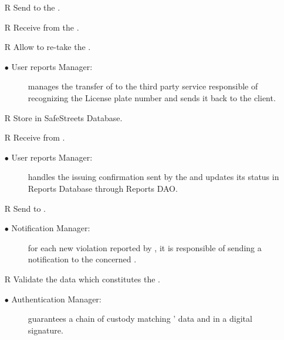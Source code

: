 \documentclass[../DD.tex]{subfiles}
\begin{document}
\begin{itemize}
	\item[R\subs{7}]Send  to the .
	\item[R\subs{8}]Receive  from the .
	\item[R\subs{26}]Allow  to re-take the .
	\begin{description}
	\item[$\bullet$ User reports Manager:] manages the transfer of  to the third party service responsible of recognizing the License plate number and sends it back to the client.
	\end{description}

	\item[R\subs{12}]Store  in SafeStreets Database.
	\item[R\subs{25}]Receive  from .	
	\begin{description}
	\item[$\bullet$ User reports Manager:] handles the  issuing confirmation sent by the  and updates its status in Reports Database through Reports DAO.
	\end{description}

	\item[R\subs{11}]Send  to .
	\begin{description}
	\item[$\bullet$ Notification Manager:] for each new violation reported by , it is responsible of sending a notification to the concerned . 
	\end{description}

	\item[R\subs{15}]Validate the data which constitutes the .
	\begin{description}
	\item[$\bullet$ Authentication Manager:] guarantees a chain of custody matching ' data and  in a digital signature.
	\end{description}


\end{itemize}
\end{document}
